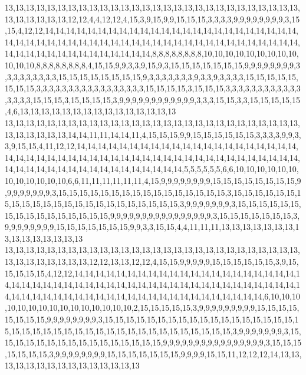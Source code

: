 13,13,13,13,13,13,13,13,13,13,13,13,13,13,13,13,13,13,13,13,13,13,13,13,13,13,13,13,13,13,13,13,13,13,12,12,4,4,12,12,4,15,3,9,15,9,9,15,15,15,3,3,3,3,9,9,9,9,9,9,9,9,3,15,15,4,12,12,14,14,14,14,14,14,14,14,14,14,14,14,14,14,14,14,14,14,14,14,14,14,14,14,14,14,14,14,14,14,14,14,14,14,14,14,14,14,14,14,14,14,14,14,14,14,14,14,14,14,14,14,14,14,14,14,14,14,14,14,14,14,14,14,14,14,8,8,8,8,8,8,8,8,10,10,10,10,10,10,10,10,10,10,10,10,8,8,8,8,8,8,8,8,4,15,15,9,9,3,3,9,15,9,3,15,15,15,15,15,15,15,9,9,9,9,9,9,9,9,3,3,3,3,3,3,3,3,3,15,15,15,15,15,15,15,15,9,3,3,3,3,3,3,3,9,3,3,9,3,3,3,3,15,15,15,15,15,15,15,15,3,3,3,3,3,3,3,3,3,3,3,3,3,3,3,3,3,15,15,15,15,3,15,15,15,3,3,3,3,3,3,3,3,3,3,3,3,3,3,3,3,15,15,15,3,15,15,15,15,3,9,9,9,9,9,9,9,9,9,9,9,9,3,3,3,15,15,3,3,15,15,15,15,15,4,6,13,13,13,13,13,13,13,13,13,13,13,13,13,13,13
13,13,13,13,13,13,13,13,13,13,13,13,13,13,13,13,13,13,13,13,13,13,13,13,13,13,13,13,13,13,13,13,13,13,14,14,11,11,14,14,11,4,15,15,15,9,9,15,15,15,15,15,15,3,3,3,3,9,9,3,3,9,15,15,4,11,12,12,14,14,14,14,14,14,14,14,14,14,14,14,14,14,14,14,14,14,14,14,14,14,14,14,14,14,14,14,14,14,14,14,14,14,14,14,14,14,14,14,14,14,14,14,14,14,14,14,14,14,14,14,14,14,14,14,14,14,14,14,14,14,14,14,14,14,5,5,5,5,5,5,6,6,10,10,10,10,10,10,10,10,10,10,10,10,6,6,11,11,11,11,11,11,4,15,9,9,9,9,9,9,9,9,15,15,15,15,15,15,15,15,9,9,9,9,9,9,9,9,3,15,15,15,15,15,15,15,15,15,15,15,15,15,15,15,15,3,15,15,15,15,15,15,15,15,15,15,15,15,15,15,15,15,15,15,15,15,15,15,15,3,9,9,9,9,9,9,9,3,15,15,15,15,15,15,15,15,15,15,15,15,15,15,15,15,9,9,9,9,9,9,9,9,9,9,9,9,9,9,9,9,3,15,15,15,15,15,15,15,3,9,9,9,9,9,9,9,9,15,15,15,15,15,15,15,9,9,3,3,15,15,4,4,11,11,11,13,13,13,13,13,13,13,13,13,13,13,13,13,13,13
13,13,13,13,13,13,13,13,13,13,13,13,13,13,13,13,13,13,13,13,13,13,13,13,13,13,13,13,13,13,13,13,13,13,13,13,12,12,13,13,12,12,4,15,15,9,9,9,9,9,15,15,15,15,15,15,3,9,15,15,15,15,15,4,12,12,14,14,14,14,14,14,14,14,14,14,14,14,14,14,14,14,14,14,14,14,14,14,14,14,14,14,14,14,14,14,14,14,14,14,14,14,14,14,14,14,14,14,14,14,14,14,14,14,14,14,14,14,14,14,14,14,14,14,14,14,14,14,14,14,14,14,14,14,14,14,14,14,14,14,6,10,10,10,10,10,10,10,10,10,10,10,10,10,10,10,2,15,15,15,15,15,3,9,9,9,9,9,9,9,9,9,15,15,15,15,15,15,15,15,9,9,9,9,9,9,9,9,3,15,15,15,15,15,15,15,15,15,15,15,15,15,15,15,15,15,15,15,15,15,15,15,15,15,15,15,15,15,15,15,15,15,15,15,15,15,15,15,15,3,9,9,9,9,9,9,9,3,15,15,15,15,15,15,15,15,15,15,15,15,15,15,15,15,9,9,9,9,9,9,9,9,9,9,9,9,9,9,9,9,3,15,15,15,15,15,15,15,3,9,9,9,9,9,9,9,9,15,15,15,15,15,15,15,9,9,9,9,15,15,11,12,12,12,14,13,13,13,13,13,13,13,13,13,13,13,13,13,13,13
